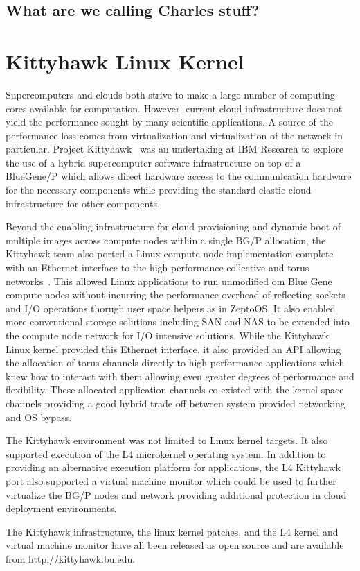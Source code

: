 \subsection{What are we calling Charles stuff?}
\section{Kittyhawk Linux Kernel}

Supercomputers and clouds both strive to make a large number of 
computing cores available for computation. 
However, current cloud infrastructure does not yield the performance 
sought by many scientific applications. A source of the performance 
loss comes from virtualization and virtualization of the network in 
particular. 
Project Kittyhawk~\cite{kh-sciencecloud} was an undertaking at IBM Research 
to explore the use of a hybrid supercomputer software infrastructure
on top of a BlueGene/P which allows direct hardware access to the 
communication hardware for the necessary components while providing 
the standard elastic cloud infrastructure for other components.

Beyond the enabling infrastructure for cloud provisioning and dynamic
boot of multiple images across compute nodes within a single BG/P
allocation, the Kittyhawk team also ported a Linux compute node
implementation complete with an Ethernet interface to the high-performance
collective and torus networks~\cite{kh-systemsjournal}.  
This allowed Linux applications to run unmodified om Blue Gene compute 
nodes without incurring the performance 
overhead of reflecting sockets and I/O operations thorugh user space
helpers as in ZeptoOS.  It also enabled more conventional storage solutions
including SAN and NAS to be extended into the compute node network for
I/O intensive solutions.  While the Kittyhawk Linux kernel provided this
Ethernet interface, it also provided an API allowing the allocation of
torus channels directly to high performance applications which knew how to
interact with them allowing even greater degrees of performance and flexibility.
These allocated application channels co-existed with the kernel-space channels
providing a good hybrid trade off between system provided networking and
OS bypass.

The Kittyhawk environment was not limited to Linux kernel targets.  
It also supported execution of the L4 microkernel operating system.  
In addition to providing an alternative execution platform for applications,
the L4 Kittyhawk port also supported a virtual machine monitor which could
be used to further virtualize the BG/P nodes and network providing additional
protection in cloud deployment environments.

The Kittyhawk infrastructure, the linux kernel patches, and the L4 kernel
and virtual machine monitor have all been released as open source and are
available from http://kittyhawk.bu.edu.
